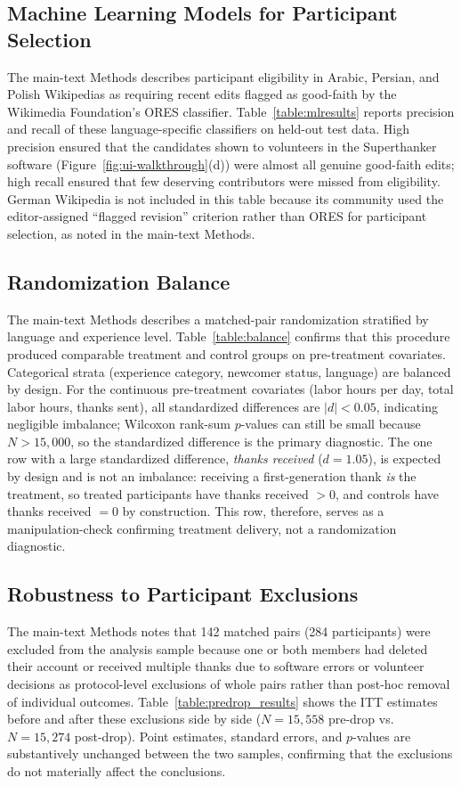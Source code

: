\documentclass[9pt,twoside,lineno]{pnas-new}
\begin{document}
\subsection*{Machine Learning Models for Participant Selection}
The main-text Methods describes participant eligibility in Arabic, Persian, and Polish Wikipedias as requiring recent edits flagged as good-faith by the Wikimedia Foundation's ORES classifier. Table~\ref{table:mlresults} reports precision and recall of these language-specific classifiers on held-out test data. High precision ensured that the candidates shown to volunteers in the Superthanker software (Figure~\ref{fig:ui-walkthrough}(d)) were almost all genuine good-faith edits; high recall ensured that few deserving contributors were missed from eligibility. German Wikipedia is not included in this table because its community used the editor-assigned ``flagged revision'' criterion rather than ORES for participant selection, as noted in the main-text Methods.


\subsection*{Randomization Balance}
The main-text Methods describes a matched-pair randomization stratified by language and experience level. Table~\ref{table:balance} confirms that this procedure produced comparable treatment and control groups on pre-treatment covariates. Categorical strata (experience category, newcomer status, language) are balanced by design. For the continuous pre-treatment covariates (labor hours per day, total labor hours, thanks sent), all standardized differences are $|d| < 0.05$, indicating negligible imbalance; Wilcoxon rank-sum $p$-values can still be small because $N > 15{,}000$, so the standardized difference is the primary diagnostic. The one row with a large standardized difference, \textit{thanks received} ($d = 1.05$), is expected by design and is not an imbalance: receiving a first-generation thank \emph{is} the treatment, so treated participants have thanks received $>0$, and controls have thanks received $=0$ by construction. This row, therefore, serves as a manipulation-check confirming treatment delivery, not a randomization diagnostic.


\subsection*{Robustness to Participant Exclusions}
The main-text Methods notes that 142 matched pairs (284 participants) were excluded from the analysis sample because one or both members had deleted their account or received multiple thanks due to software errors or volunteer decisions as protocol-level exclusions of whole pairs rather than post-hoc removal of individual outcomes. Table~\ref{table:predrop_results} shows the ITT estimates before and after these exclusions side by side ($N = 15{,}558$ pre-drop vs.\ $N = 15{,}274$ post-drop). Point estimates, standard errors, and $p$-values are substantively unchanged between the two samples, confirming that the exclusions do not materially affect the conclusions.
\end{document}
